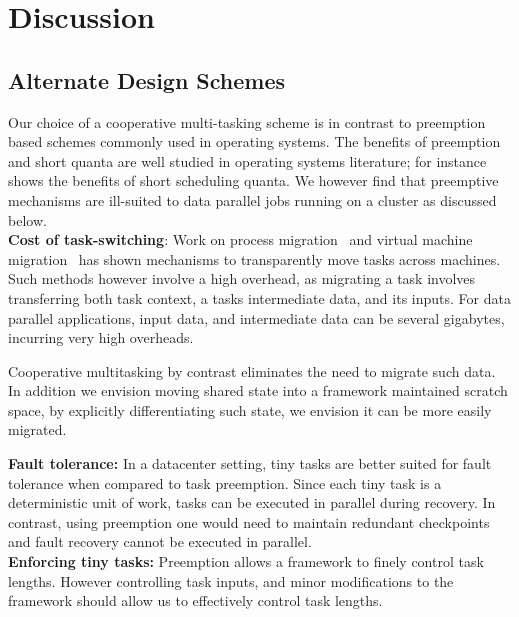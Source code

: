 \section{Discussion}

\subsection{Alternate Design Schemes}
\label{sec:alternate}
Our choice of a cooperative multi-tasking scheme is in contrast to
preemption based schemes commonly used in operating systems. The benefits of 
preemption and short quanta are well studied in operating
systems literature; for instance~\cite{sherman1972trace} shows the benefits
of short scheduling quanta. We however find that preemptive mechanisms are
ill-suited to data parallel jobs running on a cluster as discussed below.\\
\textbf{Cost of task-switching}: Work on process
migration~\cite{douglis1991transparent,milojivcic2000process} and virtual
machine migration~\cite{clark2005live} has shown mechanisms to transparently
move tasks across machines. Such methods however involve a high overhead, as
migrating a task involves transferring both task context, a tasks intermediate
data, and its inputs. For data parallel applications, input data, and intermediate
data can be several gigabytes, incurring very high overheads.

Cooperative multitasking by contrast eliminates the need to migrate such data. In
addition we envision moving shared state into a framework maintained scratch space,
by explicitly differentiating such state, we envision it can be more easily migrated.

\textbf{Fault tolerance:} In a datacenter setting, tiny tasks are better suited for
fault tolerance when compared to task preemption. Since each tiny task is a
deterministic unit of work, tasks can be executed in parallel during recovery.
In contrast, using preemption one would need to maintain redundant checkpoints
and fault recovery cannot be executed in parallel. \\

\textbf{Enforcing tiny tasks:} Preemption allows a framework to finely control
task lengths. However controlling task inputs, and minor modifications to the 
framework should allow us to effectively control task lengths.\\

